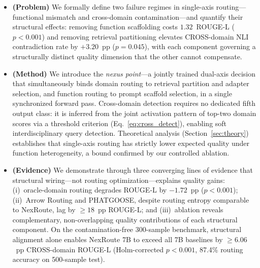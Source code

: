 \begin{itemize}
    \item \textbf{(Problem)} We formally define two failure regimes in single-axis
    routing---functional mismatch and cross-domain contamination---and quantify their
    structural effects: removing function scaffolding costs $1.32$~ROUGE-L
    ($p{<}0.001$) and removing retrieval partitioning elevates CROSS-domain NLI
    contradiction rate by $+3.20$~pp ($p{=}0.045$), with each component governing
    a structurally distinct quality dimension that the other cannot compensate.

    \item \textbf{(Method)} We introduce the \emph{nexus point}---a jointly trained
    dual-axis decision that simultaneously binds domain routing to retrieval partition
    and adapter selection, and function routing to prompt scaffold selection, in a
    single synchronized forward pass.
    Cross-domain detection requires no dedicated fifth output class: it is inferred
    from the joint activation pattern of top-two domain scores via a threshold
    criterion (Eq.~\ref{eq:cross_detect}), enabling soft interdisciplinary query
    detection.
    Theoretical analysis (Section~\ref{sec:theory}) establishes that single-axis
    routing has strictly lower expected quality under function heterogeneity, a bound
    confirmed by our controlled ablation.

    \item \textbf{(Evidence)} We demonstrate through three converging lines of
    evidence that structural wiring---not routing optimization---explains quality
    gains: (i)~oracle-domain routing degrades ROUGE-L by $-1.72$~pp ($p{<}0.001$);
    (ii)~Arrow Routing and PHATGOOSE, despite routing entropy comparable to NexRoute,
    lag by ${\geq}18$~pp ROUGE-L; and (iii)~ablation reveals complementary,
    non-overlapping quality contributions of each structural component.
    On the contamination-free 300-sample benchmark, structural alignment alone
    enables NexRoute 7B to exceed all 7B baselines by ${\geq}6.06$~pp CROSS-domain
    ROUGE-L (Holm-corrected $p{<}0.001$, 87.4\% routing accuracy on 500-sample test).
\end{itemize}



